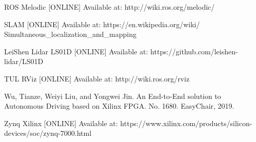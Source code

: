 \documentclass[conference]{IEEEtran}
\begin{document}
\begin{sloppypar}
\begin{thebibliography}{00}
 ROS Melodic [ONLINE] Available at: http://wiki.ros.org/melodic/

 SLAM [ONLINE] Available at: https://en.wikipedia.org/wiki/ Simultaneous\_localization\_and\_mapping

 LeiShen Lidar LS01D [ONLINE] Available at: https://github.com/leishen-lidar/LS01D

 TUL RViz [ONLINE] Available at: http://wiki.ros.org/rviz

 Wu, Tianze, Weiyi Liu, and Yongwei Jin. An End-to-End solution to Autonomous Driving based on Xilinx FPGA. No. 1680. EasyChair, 2019.

 Zynq Xilinx [ONLINE] Available at: https://www.xilinx.com/products/silicon-devices/soc/zynq-7000.html
\end{thebibliography}

\vspace{12pt}
\end{sloppypar}
\end{document}
